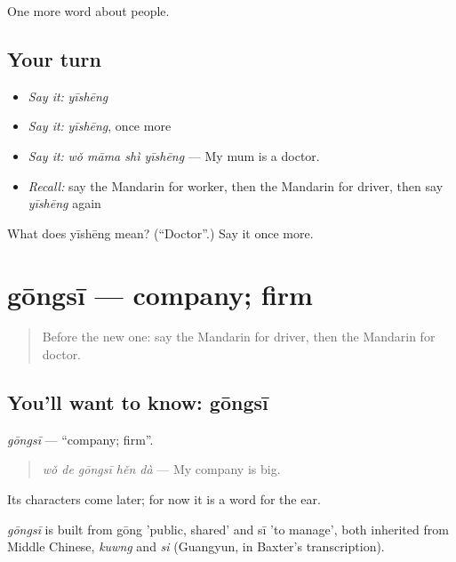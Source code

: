 \begin{grammarlens}[title={What you've built}]
One more word about people.
\end{grammarlens}

\subsection*{Your turn}
\begin{itemize}
\raggedright
  \item \emph{Say it:} \emph{yīshēng}
  \item \emph{Say it:} \emph{yīshēng}, once more
  \item \emph{Say it:} \emph{wǒ māma shì yīshēng} — My mum is a doctor.
  \item \emph{Recall:} say the Mandarin for worker, then the Mandarin for driver, then say \emph{yīshēng} again
\end{itemize}

\begin{tcolorbox}[breakable,colback=teal!4,colframe=teal!35!black,title={Before you move on}]
What does yīshēng mean? (\textquotedblleft{}Doctor\textquotedblright{}.) Say it once more.
\end{tcolorbox}
\section[gōngsī]{gōngsī — company; firm}

\label{lesson:ZH-C80-gongsi}



\begin{quote}
Before the new one: say the Mandarin for driver, then the Mandarin for doctor.
\end{quote}

\subsection*{You'll want to know: gōngsī}
\emph{gōngsī} — \textquotedblleft{}company; firm\textquotedblright{}.

\begin{quote}
\emph{wǒ de gōngsī hěn dà} — My company is big.
\end{quote}

Its characters come later; for now it is a word for the ear.

\begin{cousinweb}
\emph{gōngsī} is built from gōng 'public, shared' and sī 'to manage', both inherited from Middle Chinese, \emph{kuwng} and \emph{si} (Guangyun, in Baxter's transcription).
\end{cousinweb}

